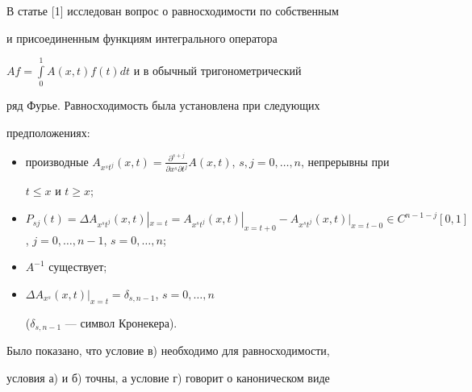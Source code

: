 

\pagestyle{plain} %







\maketitle


\label{begin}





В статье [1] исследован вопрос о равносходимости по собственным


и присоединенным функциям интегрального оператора


$Af=\int\limits_0^1A(x,t)f(t)dt$ и в обычный тригонометрический


ряд Фурье. Равносходимость была установлена при следующих


предположениях:


\begin{itemize}


\item[а)] производные $A_{x^st^j}(x,t)=\frac {\partial^{s+j}}{\partial


x^s\partial t^j}A(x,t)$, $s,j=0,\dotsc,n$, непрерывны при


$t\le x$ и $t\ge x$;


\item[б)] $P_{sj}(t)=\Delta A_{x^st^j}(x,t)|_{x=t}=A_{x^st^j}(x,t)|


_{x=t+0}-A_{x^st^j}(x,t)|_{x=t-0}\in


C^{n-1-j}[0,1]$, $j=0,\dotsc,n-1$, $s=0,\dotsc,n$;


\item[в)] $A^{-1}$ существует;


\item[г)] $\Delta A_{x^s}(x,t)|_{x=t}=\delta_{s,n-1}$, $s=0,\dotsc,n$


($\delta_{s,n-1}$ --- символ Кронекера).


\end{itemize}





Было показано, что условие в) необходимо для равносходимости,


условия а) и б) точны, а условие г) говорит о каноническом виде


